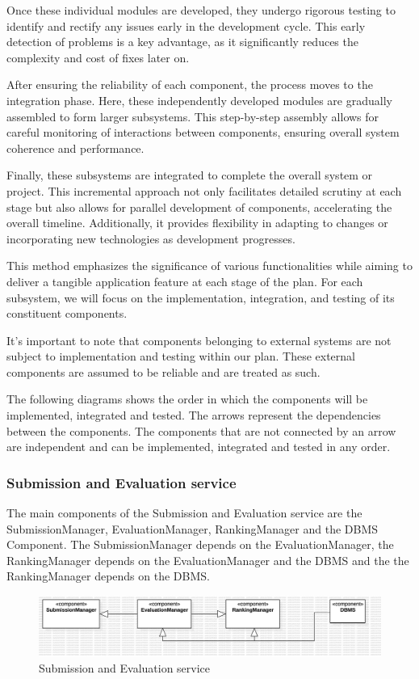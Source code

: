 Once these individual modules are developed, they undergo rigorous testing to identify and rectify any issues early in the development cycle. This early detection of problems is a key advantage, as it significantly reduces the complexity and cost of fixes later on. 

After ensuring the reliability of each component, the process moves to the integration phase. Here, these independently developed modules are gradually assembled to form larger subsystems. This step-by-step assembly allows for careful monitoring of interactions between components, ensuring overall system coherence and performance.

Finally, these subsystems are integrated to complete the overall system or project. This incremental approach not only facilitates detailed scrutiny at each stage but also allows for parallel development of components, accelerating the overall timeline. Additionally, it provides flexibility in adapting to changes or incorporating new technologies as development progresses. 

This method emphasizes the significance of various functionalities while aiming to deliver a tangible application feature at each stage of the plan. For each subsystem, we will focus on the implementation, integration, and testing of its constituent components.

It's important to note that components belonging to external systems are not subject to implementation and testing within our plan. These external components are assumed to be reliable and are treated as such.

The following diagrams shows the order in which the components will be implemented, integrated and tested. The arrows represent the dependencies between the components. The components that are not connected by an arrow are independent and can be implemented, integrated and tested in any order.

\subsubsection*{Submission and Evaluation service}
The main components of the Submission and Evaluation service are the SubmissionManager, EvaluationManager, RankingManager and the DBMS Component. The SubmissionManager depends on the EvaluationManager, the RankingManager depends on the EvaluationManager and the DBMS and the the RankingManager depends on the DBMS.
\begin{figure}[H]
    \centering
    \includegraphics[width=\textwidth]{Diagrams/SubmissionIntegrationPlan.jpg}
    \caption{Submission and Evaluation service}
    \label{fig:submission_and_evaluation}
\end{figure}

